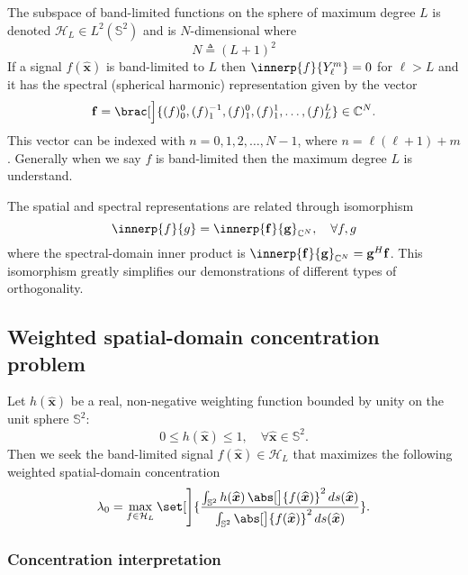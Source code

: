 \documentclass[10pt, twocolumn, twoside]{IEEEtran}
\newcommand{\untsph}{\mathbb{S}^{2}} %
\newcommand{\unit}[1]{\widehat{\bm{#1}}}
\newcommand{\cmplx}{\mathbb{C}} %
\newcommand{\dfn}{\triangleq}
\begin{document}
The subspace of band-limited functions on the sphere of maximum degree $L$ is denoted $\mathcal{H}_{L}\in L^2(\untsph)$ and is $N$-dimensional where \[N\dfn(L+1)^2\]  If a signal $f(\unit{x})$ is band-limited to $L$ then $\innerp{f}{Y_{\ell}^{m}}=0$ for $\ell>L$ and it has the spectral (spherical harmonic) representation given by the vector
\begin{equation}
\label{eqn:f-spec}
	\mathbf{f}=\brac[\Big]{(f)_0^0, (f)_1^{-1}, (f)_1^{0}, (f)_1^{1},\dotsc, (f)_L^{L}}
	\in\cmplx^{N}.
\end{equation}
This vector can be indexed with $n=0,1,2,\dotsc,N-1$, where $n=\ell(\ell+1)+m$.  Generally when we say $f$ is band-limited then the maximum degree $L$ is understand.

The spatial and spectral representations are related through isomorphism\cite{Kennedy-book:2013}
\begin{equation}
\label{eqn:isom}
	\innerp{f}{g}=\innerp{\mathbf{f}}{\mathbf{g}}_{\cmplx^N},\quad\forall f,g
\end{equation}
where the spectral-domain inner product is $\innerp{\mathbf{f}}{\mathbf{g}}_{\cmplx^N}=\mathbf{g}^H\mathbf{f}$.
This isomorphism greatly simplifies our demonstrations of different types of orthogonality.

\subsection{Weighted spatial-domain concentration problem}
\label{sec:wsdcp}

Let $h(\unit{x})$ be a real, non-negative weighting function bounded by unity on the unit sphere $\untsph$:
\begin{equation}
\label{eqn:h-weight}
	0\leq{}h(\unit{x})\leq{}1,\quad\forall\unit{x}\in\untsph.
\end{equation}
Then we seek the band-limited signal $f(\unit{x})\in\mathcal{H}_{L}$ that maximizes the following weighted spatial-domain concentration
\begin{equation}
\label{eqn:conc-spat}
	\lambda_0
		=\max_{f\in\mathcal{H}_{L}}
		\set[\Bigg]{\frac{\int_{\untsph} h(\unit{x})\,\abs[\big]{f(\unit{x})}^2\,ds(\unit{x})}%
		{\int_{\untsph} \abs[\big]{f(\unit{x})}^2\,ds(\unit{x})}}.
\end{equation}

\subsubsection{Concentration interpretation}
\end{document}
